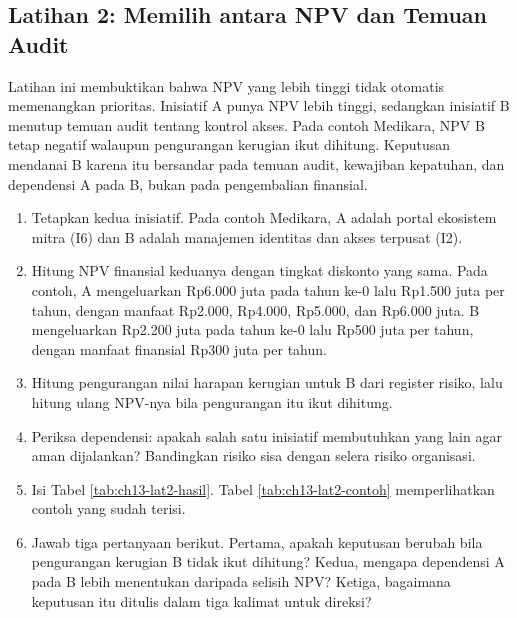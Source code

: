 \subsection*{Latihan 2: Memilih antara NPV dan Temuan Audit}

Latihan ini membuktikan bahwa NPV yang lebih tinggi tidak otomatis
memenangkan prioritas. Inisiatif A punya NPV lebih tinggi, sedangkan
inisiatif B menutup temuan audit tentang kontrol akses. Pada contoh Medikara,
NPV B tetap negatif walaupun pengurangan kerugian ikut dihitung. Keputusan
mendanai B karena itu bersandar pada temuan audit, kewajiban kepatuhan, dan
dependensi A pada B, bukan pada pengembalian finansial.

\begin{enumerate}
  \item Tetapkan kedua inisiatif. Pada contoh Medikara, A adalah portal
        ekosistem mitra (I6) dan B adalah manajemen identitas dan akses
        terpusat (I2).
  \item Hitung NPV finansial keduanya dengan tingkat diskonto yang sama.
        Pada contoh, A mengeluarkan Rp6.000 juta pada tahun ke-0 lalu Rp1.500
        juta per tahun, dengan manfaat Rp2.000, Rp4.000, Rp5.000, dan Rp6.000
        juta. B mengeluarkan Rp2.200 juta pada tahun ke-0 lalu Rp500 juta per
        tahun, dengan manfaat finansial Rp300 juta per tahun.
  \item Hitung pengurangan nilai harapan kerugian untuk B dari register
        risiko, lalu hitung ulang NPV-nya bila pengurangan itu ikut
        dihitung.
  \item Periksa dependensi: apakah salah satu inisiatif membutuhkan yang
        lain agar aman dijalankan? Bandingkan risiko sisa dengan selera
        risiko organisasi.
  \item Isi Tabel \ref{tab:ch13-lat2-hasil}. Tabel \ref{tab:ch13-lat2-contoh}
        memperlihatkan contoh yang sudah terisi.
  \item Jawab tiga pertanyaan berikut. Pertama, apakah keputusan berubah
        bila pengurangan kerugian B tidak ikut dihitung? Kedua, mengapa
        dependensi A pada B lebih menentukan daripada selisih NPV? Ketiga,
        bagaimana keputusan itu ditulis dalam tiga kalimat untuk direksi?
\end{enumerate}


